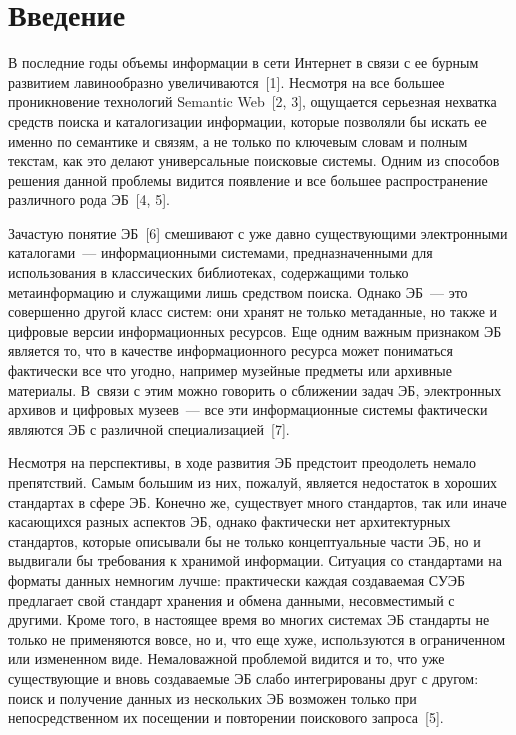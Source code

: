       \begin{multicols}{2}

      \label{st\stat}


\section{Введение}
  
  В последние годы объемы информации в сети Интернет в связи с ее бурным развитием 
лавинообразно увеличиваются~[1]. Несмотря на все большее проникновение технологий 
Semantic Web~[2, 3], ощущается серьезная нехватка средств поиска и каталогизации 
информации, которые позволяли бы искать ее именно по семантике и связям, а не только по 
ключевым словам и полным текстам, как это делают универсальные поисковые системы. 
Одним из способов решения данной проблемы видится появление и все большее 
распространение различного рода ЭБ~[4, 5].
  
  Зачастую понятие ЭБ~[6] смешивают с уже давно существующими электронными 
каталогами~--- информационными системами, предназначенными для использования в 
классических библиотеках, содержащими только метаинформацию и служащими лишь 
средством поиска. Однако ЭБ~--- это совершенно другой класс систем: они хранят не только 
метаданные, но также и цифровые версии информационных ресурсов. Еще одним важным 
признаком ЭБ является то, что в качестве информационного ресурса может пониматься 
фактически все что угодно, например музейные предметы или архивные материалы. В~связи 
с этим можно говорить о сближении задач ЭБ, электронных архивов и цифровых музеев~--- 
все эти информационные системы фактически являются ЭБ с различной специализацией~[7].
  
  Несмотря на перспективы, в ходе развития ЭБ предстоит преодолеть немало препятствий. 
Самым большим из них, пожалуй, является недостаток в хороших стандартах в сфере ЭБ. 
Конечно же, существует много стандартов, так или иначе касающихся разных аспектов ЭБ, 
однако фактически нет архитектурных стандартов, которые описывали бы не только 
концептуальные части ЭБ, но и выдвигали бы требования к хранимой информации. 
Ситуация со стандартами на форматы данных немногим лучше: практически каждая 
создаваемая СУЭБ предлагает свой стандарт хранения и обмена данными, несовместимый с 
другими. Кроме того, в настоящее время во многих системах ЭБ стандарты не только не 
применяются вовсе, но и, что еще хуже, используются в ограниченном или измененном виде. 
Немаловажной проблемой видится и то, что уже существующие и вновь создаваемые ЭБ 
слабо интегрированы друг с другом: поиск и получение данных из нескольких ЭБ возможен 
только при непосредственном их посещении и повторении поискового запроса~[5].
  

\end{multicols}

